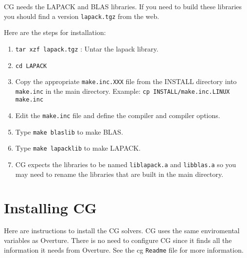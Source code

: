 \documentclass{article}
\begin{document}
CG needs the LAPACK and BLAS libraries. If you need to build these libraries you
should find a version {\tt lapack.tgz} from the web. 

\noindent Here are the steps for installation:
\begin{enumerate}
    \item {\tt tar xzf lapack.tgz} :  Untar the lapack library.
    \item {\tt cd LAPACK}
    \item Copy the appropriate {\tt make.inc.XXX} file from the INSTALL directory into
           {\tt make.inc} in the main directory. Example: {\tt cp INSTALL/make.inc.LINUX make.inc}
    \item Edit the {\tt make.inc} file and define the compiler and compiler options.
    \item Type {\tt make blaslib} to make BLAS.
    \item Type {\tt make lapacklib} to make LAPACK.
    \item CG expects the libraries to be named {\tt liblapack.a} and {\tt libblas.a}
          so you may need to rename the libraries that are built in the main directory.
\end{enumerate}

\clearpage
\section{Installing CG} \label{sec:installingCG}

Here are instructions to install the CG solvers. CG uses the same enviromental variables 
as Overture. There is no need to configure CG since it finds all the information it
needs from Overture. See the cg {\tt Readme} file for more information. 
\end{document}
